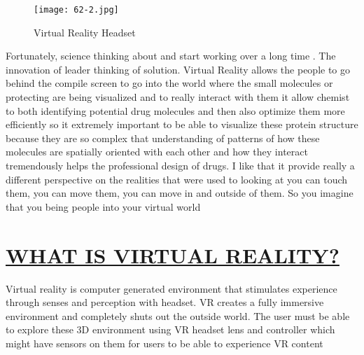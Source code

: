 \documentclass[12pts]{article}
\begin{document}
\begin{figure}[h]
\centering
\texttt{[image: 62-2.jpg]}
\caption{Virtual Reality Headset}
\end{figure}

\begin{flushleft}
\begin{large}
Fortunately, science thinking about and start working over a 
long time . The innovation of leader thinking of solution.
 Virtual Reality allows the people to go behind the compile 
screen to go into the world where the small molecules or protecting are being 
visualized and to really interact with them it allow chemist to both identifying 
potential drug molecules and then also optimize them more efficiently so it 
extremely important to be able to visualize these protein structure because 
they are so complex that understanding of patterns of how these molecules 
are spatially oriented with each other and how they interact tremendously 
helps the professional design of drugs. I like that it provide really a different 
perspective on the realities that were used to looking at you can touch them, 
you can move them, you can move in and outside of them. So you imagine that 
you being people into your virtual world
\end{large}
\end{flushleft}

\section*{\underline{WHAT IS VIRTUAL REALITY?}}
\begin{large}
\begin{flushleft}
Virtual reality is computer generated environment that stimulates experience through senses and perception with headset. VR creates a fully immersive 
environment and completely shuts out the outside world. The user must be 
able to explore these 3D environment using VR headset lens and controller 
which might have sensors on them for users to be able to experience VR content
\end{flushleft}
\end{large}
\end{document}
